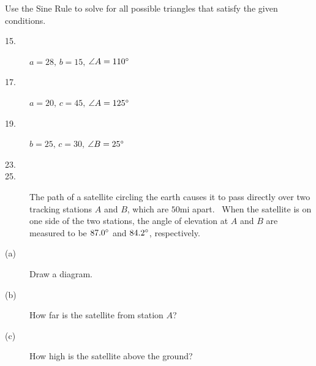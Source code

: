 Use the Sine Rule to solve for all possible triangles
that satisfy the given conditions. 


\begin{description}
\item [15.] $a =28\text{,}$ $b =15\text{,}$ $\angle A =110 \mbox{{\ensuremath{{}^\circ}}}$ 

\item [17.] $a =20\text{,}$ $c =45\text{,}$ $\angle A =125 \mbox{{\ensuremath{{}^\circ}}}$ 

\item [19.] $b =25\text{,}$ $c =30\text{,}$ $\angle B =25 \mbox{{\ensuremath{{}^\circ}}}$ 

\item [23.]   
\columnsep =30pt
 

\item [25.]
The path of a satellite circling the earth causes it to pass directly over two tracking stations $A$ and $B$, which are $50 \mbox{mi}$ apart. \ When the satellite is on one side of the
two stations, the angle of elevation at $A$ and $B$ are measured to be $87.0 \mbox{{\ensuremath{{}^\circ}}}$ and $84.2 \mbox{{\ensuremath{{}^\circ}}}$, respectively. 

\item [(a)]
Draw a diagram. 

\item [(b)] How far is the satellite from
station $A$? 

\item [(c)] How high is the satellite
above the ground? 


\end{description}
